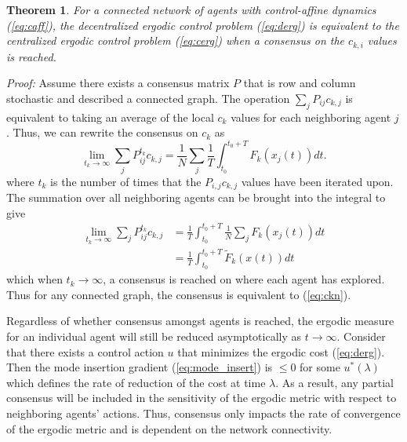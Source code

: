 \documentclass[conference]{IEEEtran}
\newtheorem{theorem}{Theorem}
\begin{document}
\begin{theorem}
For a connected network of agents with control-affine dynamics (\ref{eq:caff}), the decentralized ergodic control problem (\ref{eq:derg}) is equivalent to the centralized ergodic control problem (\ref{eq:cerg}) when a consensus on the $c_{k,i}$ values is reached.
\end{theorem}
{\it Proof: } Assume there exists a consensus matrix $P$ that is row and column stochastic and described a connected graph. The operation $ \sum_j P_{ij} c_{k,j}$ is equivalent to taking an average of the local $c_k$ values for each neighboring agent $j$. Thus, we can rewrite the consensus on $c_k$ as
\begin{equation}
\lim_{t_k \to \infty}\sum_j P_{ij}^{t_k} c_{k,j} = \frac{1}{N}\sum_j \frac{1}{T} \int_{t_0}^{t_0 +T} F_k(x_j(t)) dt.
\end{equation}
where $t_k$ is the number of times that the $P_{i,j} c_{k,j}$ values have been iterated upon. The summation over all neighboring agents can be brought into the integral to give
\begin{equation}
\begin{aligned}
\lim_{t_k \to \infty}\sum_j P_{ij}^{t_k} c_{k,j} &=  \frac{1}{T} \int_{t_0}^{t_0 +T} \frac{1}{N}\sum_j F_k(x_j(t)) dt \\
&= \frac{1}{T} \int_{t_0}^{t_0 +T} \tilde{F}_k(x(t)) dt
\end{aligned}
\end{equation}
which when $t_k \to \infty$, a consensus is reached on where each agent has explored. Thus for any connected graph, the consensus is equivalent to (\ref{eq:ckn}).

Regardless of whether consensus amongst agents is reached, the ergodic measure for an individual agent will still be reduced asymptotically as $t \to \infty$. Consider that there exists a control action $u$ that minimizes the ergodic cost (\ref{eq:derg}). Then the mode insertion gradient (\ref{eq:mode_insert}) is $\le 0$ for some $u^*(\lambda)$ which defines the rate of reduction of the cost at time $\lambda$. As a result, any partial consensus will be included in the sensitivity of the ergodic metric with respect to neighboring agents' actions. Thus, consensus only impacts the rate of convergence of the ergodic metric and is dependent on the network connectivity.
\end{document}

